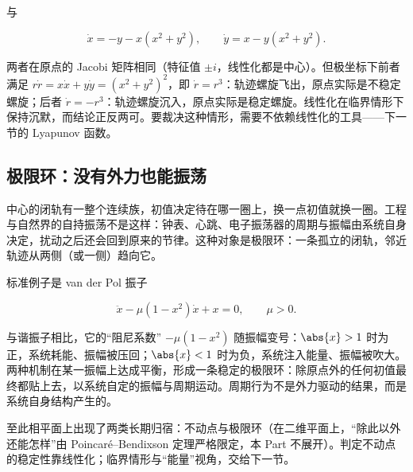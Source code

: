 与

\[
\dot x=-y-x(x^2+y^2),
\qquad
\dot y=x-y(x^2+y^2).
\]

两者在原点的 Jacobi 矩阵相同（特征值 \(\pm i\)，线性化都是中心）。但极坐标下前者满足 \(r\dot r=x\dot x+y\dot y=(x^2+y^2)^2\)，即 \(\dot r=r^3\)：轨迹螺旋飞出，原点实际是不稳定螺旋；后者 \(\dot r=-r^3\)：轨迹螺旋沉入，原点实际是稳定螺旋。线性化在临界情形下保持沉默，而结论正反两可。要裁决这种情形，需要不依赖线性化的工具——下一节的 Lyapunov 函数。

\subsection{极限环：没有外力也能振荡}

中心的闭轨有一整个连续族，初值决定待在哪一圈上，换一点初值就换一圈。工程与自然界的自持振荡不是这样：钟表、心跳、电子振荡器的周期与振幅由系统自身决定，扰动之后还会回到原来的节律。这种对象是极限环：一条孤立的闭轨，邻近轨迹从两侧（或一侧）趋向它。

标准例子是 van der Pol 振子

\[
\ddot x-\mu(1-x^2)\dot x+x=0,
\qquad \mu>0.
\]

与谐振子相比，它的``阻尼系数'' \(-\mu(1-x^2)\) 随振幅变号：\(\abs{x}>1\) 时为正，系统耗能、振幅被压回；\(\abs{x}<1\) 时为负，系统注入能量、振幅被吹大。两种机制在某一振幅上达成平衡，形成一条稳定的极限环：除原点外的任何初值最终都贴上去，以系统自定的振幅与周期运动。周期行为不是外力驱动的结果，而是系统自身结构产生的。

至此相平面上出现了两类长期归宿：不动点与极限环（在二维平面上，``除此以外还能怎样''由 Poincar\'e--Bendixson 定理严格限定，本 Part 不展开）。判定不动点的稳定性靠线性化；临界情形与``能量''视角，交给下一节。
